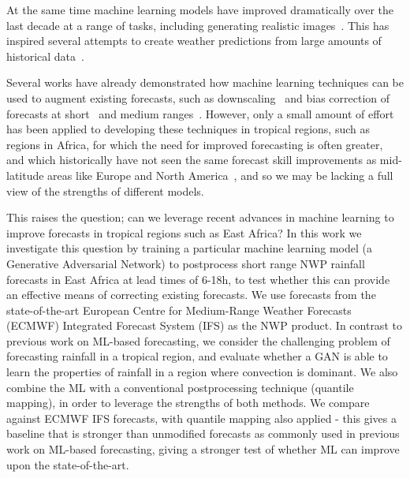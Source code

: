 \documentclass{article}
\begin{document}

At the same time machine learning models have improved dramatically over the last decade at a range of tasks, including generating realistic images~\citep{karras_style-based_2019}. This has inspired several attempts to create weather predictions from large amounts of historical data~\citep{nguyen_climax_2023, bi_pangu-weather_2022,ravuri_skilful_2021, zhang_skilful_2023,lam_graphcast_2022}. 

Several works have already demonstrated how machine learning techniques can be used to augment existing forecasts, such as downscaling~\citep{harris_generative_2022, leinonen_latent_2023} and bias correction of forecasts at short~\citep{rasp_neural_2018} and medium ranges~\citep{ben-bouallegue_improving_2023}. However, only a small amount of effort has been applied to developing these techniques in tropical regions, such as regions in Africa, for which the need for improved forecasting is often greater, and which historically have not seen the same forecast skill improvements as mid-latitude areas like Europe and North America~\citep{youds_gcrf_2021}, and so we may be lacking a full view of the strengths of different models.

This raises the question; can we leverage recent advances in machine learning to improve forecasts in tropical regions such as East Africa? In this work we investigate this question by training a particular machine learning model (a Generative Adversarial Network) to postprocess short range NWP rainfall forecasts in East Africa at lead times of 6-18h, to test whether this can provide an effective means of correcting existing forecasts. We use forecasts from the state-of-the-art European Centre for Medium-Range Weather Forecasts (ECMWF) Integrated Forecast System (IFS) as the NWP product. In contrast to previous work on ML-based forecasting, we consider the challenging problem of forecasting rainfall in a tropical region, and evaluate whether a GAN is able to learn the properties of rainfall in a region where convection is dominant. We also combine the ML with a conventional postprocessing technique (quantile mapping), in order to leverage the strengths of both methods. We compare against ECMWF IFS forecasts, with quantile mapping also applied - this gives a baseline that is stronger than unmodified forecasts as commonly used in previous work on ML-based forecasting, giving a stronger test of whether ML can improve upon the state-of-the-art. 
\end{document}
